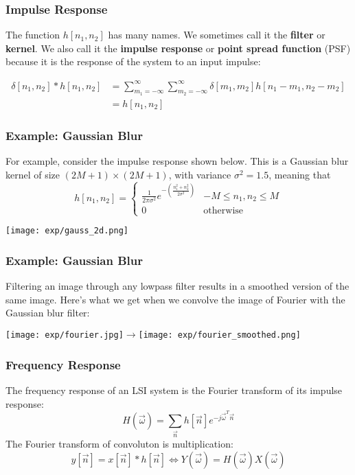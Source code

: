\documentclass{beamer}
\begin{document}
\begin{frame}
  \frametitle{Impulse Response}

  The function $h[n_1,n_2]$ has many names.  We sometimes call it the
  {\bf filter} or {\bf kernel}.  We also call it the {\bf impulse
    response} or {\bf point spread function} (PSF) because it is the
  response of the system to an input impulse:

  \begin{align*}
    \delta[n_1,n_2]\ast h[n_1,n_2] &=
    \sum_{m_1=-\infty}^\infty\sum_{m_2=-\infty}^\infty \delta[m_1,m_2]h[n_1-m_1,n_2-m_2] \\
    & = h[n_1,n_2]
  \end{align*}
\end{frame}

\begin{frame}
  \frametitle{Example: Gaussian Blur}
  For example, consider the impulse response shown below.  This
  is a Gaussian blur kernel of size $(2M+1)\times(2M+1)$, with variance
  $\sigma^2=1.5$, meaning that
  \begin{displaymath}
    h[n_1,n_2] = \begin{cases}
      \frac{1}{2\pi\sigma^2}e^{-\left(\frac{n_1^2+n_2^2}{2\sigma^2}\right)} & -M\le n_1,n_2\le M\\
      0 & \mbox{otherwise}
    \end{cases}
  \end{displaymath}
  \centerline{\texttt{[image: exp/gauss\_2d.png]}}
\end{frame}

\begin{frame}
  \frametitle{Example: Gaussian Blur}

  Filtering an image through any lowpass filter results in a smoothed
  version of the same image.  Here's what we get when we convolve the
  image of Fourier with the Gaussian blur filter:

  \centerline{\texttt{[image: exp/fourier.jpg]}$\rightarrow$\texttt{[image: exp/fourier\_smoothed.png]}}
\end{frame}

\begin{frame}
  \frametitle{Frequency Response}

  The frequency response of an LSI system is the Fourier transform of
  its impulse response:
  \[
  H(\vec\omega) = \sum_{\vec{n}} h[\vec{n}] e^{-j\vec\omega^T\vec{n}}
  \]
  The Fourier transform of convoluton is multiplication:
  \[
  y[\vec{n}]=x[\vec{n}]\ast h[\vec{n}] \Leftrightarrow Y(\vec\omega)=H(\vec\omega)X(\vec\omega)
  \]
\end{frame}
\end{document}
